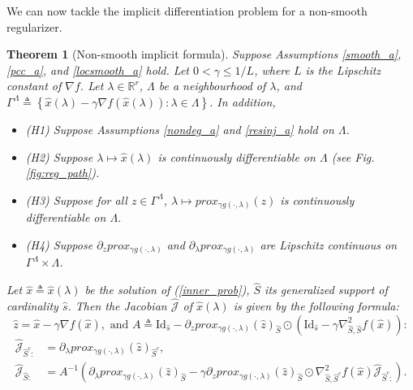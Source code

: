 \documentclass[11pt, twoside]{report}
\newtheorem{theorem}{Theorem}[section]
\begin{document}
We can now tackle the implicit differentiation problem for a non-smooth regularizer.

\begin{theorem}[Non-smooth implicit formula] 
\label{nonsmooth_gradient}
Suppose Assumptions \ref{smooth_a}, \ref{pcc_a}, and \ref{locsmooth_a} hold. Let $0 < \gamma \leq 1/L$, where $L$ is the Lipschitz constant of $\nabla f$. Let $\lambda \in \mathbb{R}^r$, $\Lambda$ be a neighbourhood of $\lambda$, and $\Gamma^\Lambda \triangleq \left\{\hat{x}(\lambda) - \gamma \nabla f(\hat{x}(\lambda)) : \lambda \in \Lambda \right\}$. In addition,
\begin{itemize}
    \item (H1) Suppose Assumptions \ref{nondeg_a} and \ref{resinj_a} hold on $\Lambda$.
    \item (H2) Suppose $\lambda \mapsto \hat{x}(\lambda)$ is continuously differentiable on $\Lambda$ (see Fig. \ref{fig:reg_path}).
    \item (H3) Suppose for all $z \in \Gamma^\Lambda$, $\lambda \mapsto prox_{\gamma g(\cdot,\lambda)}(z)$ is continuously differentiable on $\Lambda$.
    \item (H4) Suppose $\partial_z prox_{\gamma g(\cdot,\lambda)} $ and $\partial_\lambda prox_{\gamma g(\cdot,\lambda)}$ are Lipschitz continuous on $\Gamma^\Lambda \times \Lambda$.
\end{itemize}

Let $\hat{x} \triangleq \hat{x}(\lambda)$ be the solution of (\ref{inner_prob}), $\hat{S}$ its generalized support of cardinality $\hat{s}$. Then the Jacobian $\hat{\mathcal{J}}$ of $\hat{x}(\lambda)$ is given by the following formula:
\[\hat{z} = \hat{x} - \gamma \nabla f(\hat{x}), \text{ and } A \triangleq \mathrm{Id}_{\hat{s}} - \partial_z prox_{\gamma g(\cdot,\lambda)}(\hat{z})_{\hat{S}} \odot \left( \mathrm{Id}_{\hat{s}} - \gamma \nabla^2_{\hat{S},\hat{S}} f(\hat{x})  \right):\]
\begin{align}
    \hat{\mathcal{J}}_{\hat{S}^c:} &= \partial_\lambda prox_{\gamma g(\cdot,\lambda)}(\hat{z})_{\hat{S}^c}, \label{J_inact}\\
    \hat{\mathcal{J}}_{\hat{S}:} &= A^{-1} \left( \partial_\lambda prox_{\gamma g(\cdot,\lambda)}(\hat{z})_{\hat{S}} - \gamma \partial_z prox_{\gamma g(\cdot,\lambda)}(\hat{z})_{\hat{S}} \odot  \nabla^2_{\hat{S},\hat{S}^c} f(\hat{x}) \hat{\mathcal{J}}_{\hat{S}^c:}  \right). \label{J_act}
\end{align}
\end{theorem}
\end{document}
